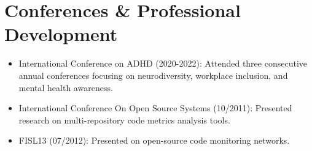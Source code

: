 \section{Conferences \& Professional Development}
\begin{itemize}
    \item \footnotesize{International Conference on ADHD (2020-2022):}\scriptsize{ Attended three consecutive annual conferences focusing on neurodiversity, workplace inclusion, and mental health awareness.}
    \item \footnotesize{International Conference On Open Source Systems (10/2011):}\scriptsize{ Presented research on multi-repository code metrics analysis tools.}
    \item \footnotesize{FISL13 (07/2012):}\scriptsize{ Presented on open-source code monitoring networks.}
\end{itemize}